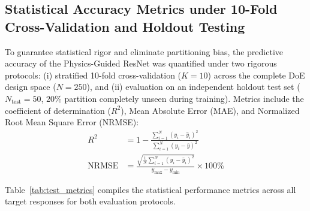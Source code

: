 \documentclass[preprint,12pt,3p]{elsarticle}
\begin{document}
\subsection{Statistical Accuracy Metrics under 10-Fold Cross-Validation and Holdout Testing}
To guarantee statistical rigor and eliminate partitioning bias, the predictive accuracy of the Physics-Guided ResNet was quantified under two rigorous protocols: (i) stratified 10-fold cross-validation ($K = 10$) across the complete DoE design space ($N = 250$), and (ii) evaluation on an independent holdout test set ($N_{\text{test}} = 50$, $20\%$ partition completely unseen during training). Metrics include the coefficient of determination ($R^2$), Mean Absolute Error (MAE), and Normalized Root Mean Square Error (NRMSE):
\begin{align}
  R^2 &= 1 - \frac{\sum_{i=1}^{N} (y_i - \hat{y}_i)^2}{\sum_{i=1}^{N} (y_i - \bar{y})^2} \label{eq:r2} \\
  \text{NRMSE} &= \frac{\sqrt{\frac{1}{N} \sum_{i=1}^{N} (y_i - \hat{y}_i)^2}}{y_{\max} - y_{\min}} \times 100\% \label{eq:nrmse}
\end{align}

Table~\ref{tab:test_metrics} compiles the statistical performance metrics across all target responses for both evaluation protocols.
\end{document}
